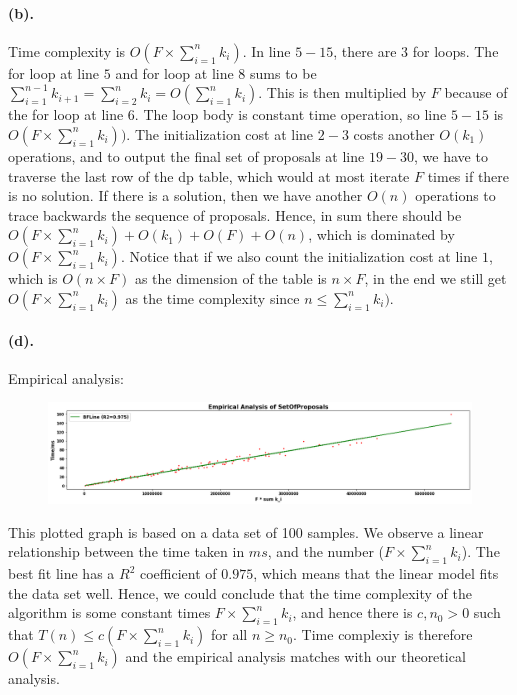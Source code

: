 \documentclass[12pt]{article}
\begin{document}
\paragraph{(b).} Time complexity is \(O(F \times \sum_{i=1}^{n} k_i)\). In line \(5-15\), there are \(3\) for loops. The for loop at line \(5\) and for loop at line \(8\) sums to be \(\sum_{i=1}^{n-1} k_{i+1} = \sum_{i=2}^{n} k_{i} = O(\sum_{i=1}^{n} k_{i})\). This is then multiplied by \(F\) because of the for loop at line \(6\). The loop body is constant time operation, so line \(5-15\) is \(O(F \times \sum_{i=1}^{n} k_i))\). The initialization cost at line \(2-3\) costs another \(O(k_1)\) operations, and to output the final set of proposals at line \(19-30\), we have to traverse the last row of the dp table, which would at most iterate \(F\) times if there is no solution. If there is a solution, then we have another \(O(n)\) operations to trace backwards the sequence of proposals. Hence, in sum there should be \(O(F \times \sum_{i=1}^{n} k_i) + O(k_1) + O(F) + O(n)\), which is dominated by \(O(F \times \sum_{i=1}^{n} k_i)\). Notice that if we also count the initialization cost at line \(1\), which is \(O(n \times F)\) as the dimension of the table is \(n \times F\), in the end we still get \(O(F \times \sum_{i=1}^{n} k_i)\) as the time complexity since \(n \leq \sum_{i=1}^{n} k_i)\).

\paragraph{(d).}
Empirical analysis:
\begin{figure}[H]
     \centering
     \includegraphics[width = \textwidth]{q6d.png}
\end{figure}
\noindent This plotted graph is based on a data set of 100 samples. We observe a linear relationship between the time taken in \(ms\), and the number  (\(F \times \sum_{i=1}^n k_i\)). The best fit line has a \(R^2\) coefficient of \(0.975\), which means that the linear model fits the data set well. Hence, we could conclude that the time complexity of the algorithm is some constant times \(F \times \sum_{i=1}^n k_i\), and hence there is \(c, n_0 > 0\) such that \(T(n) \leq c(F\times \sum_{i=1}^n k_i)\) for all \(n \geq n_0\). Time complexiy is therefore \(O(F \times \sum_{i=1}^n k_i)\) and the empirical analysis matches with our theoretical analysis. 
\end{document}
